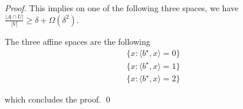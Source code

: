 \begin{proof}
    This implies on one of the following three spaces, we have $\frac{|A\cap U|}{|V|} \geq \delta + \Omega(\delta^2)$. 
    
    The three affine spaces are the following
    \begin{equation}
        \begin{matrix}
            \{x : \langle b^\star, x \rangle = 0  \} \\
            \{x : \langle b^\star, x \rangle = 1  \} \\
            \{x : \langle b^\star, x \rangle = 2  \}
        \end{matrix}
    \end{equation}
    
    which concludes the proof. \qed
\end{proof}
